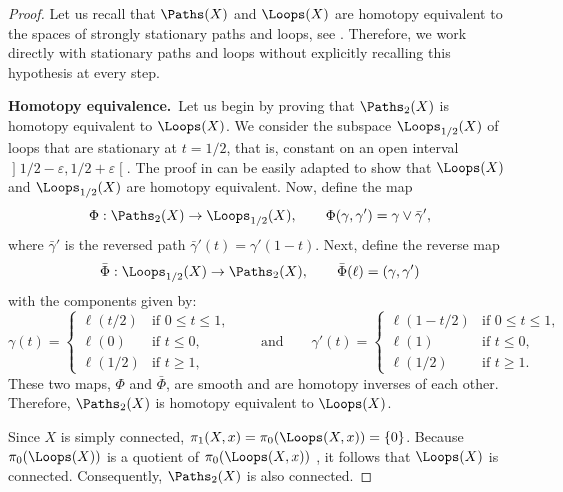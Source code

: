 \begin{proof}
  Let us recall that $\Paths(X)$ and $\Loops(X)$ are homotopy equivalent to the spaces of strongly stationary paths and loops,
  see \cite[]{PIZ13}.
  Therefore,
  we work directly with stationary paths and loops without explicitly recalling this hypothesis at every step.
  
  \textbf{Homotopy equivalence.}~Let us begin by proving that $\Paths_2(X)$ is homotopy equivalent to $\Loops(X)$.
  We consider the subspace $\Loops_{1/2}(X)$ of loops that are stationary at $t = 1/2$,
  that is,
  constant on an open interval $\mathopen]1/2 -\varepsilon, 1/2+\varepsilon\mathclose[$.
  The proof in \cite[Ex. 84]{PIZ13} can be easily adapted to show that $\Loops(X)$ and $\Loops_{1/2}(X)$ are homotopy equivalent.
  Now,
  define the map
  \[
    \Phi: \Paths_2(X) \to \Loops_{1/2}(X),
    \qquad
    \Phi(\gamma,\gamma') = \gamma \vee \bar\gamma',
    \]
  where $\bar\gamma'$ is the reversed path $\bar\gamma'(t) = \gamma'(1-t)$.
  Next,
  define the reverse map
  \[
    \bar\Phi : \Loops_{1/2}(X) \to \Paths_2(X),
    \qquad
    \bar\Phi(\ell) = (\gamma,\gamma')
    \]
  with the components given by:
  \[
    \gamma(t) =
    \begin{cases}
    \ell(t/2) & \text{if } 0 \leq t \leq 1, \\
    \ell(0)   & \text{if } t \leq 0, \\
    \ell(1/2) & \text{if } t \geq 1,
    \end{cases}
    \qquad\text{and}\qquad
    \gamma'(t) =
    \begin{cases}
    \ell(1-t/2) & \text{if } 0 \leq t \leq 1, \\
    \ell(1)     & \text{if } t \leq 0, \\
    \ell(1/2)   & \text{if } t \geq 1.
    \end{cases}
    \]
  These two maps,
  $\Phi$ and $\bar\Phi$,
  are smooth and are homotopy inverses of each other.
  Therefore,
  $\Paths_2(X)$ is homotopy equivalent to $\Loops(X)$.
  
  Since $X$ is simply connected,
  $\pi_1(X,x) = \pi_0(\Loops(X,x)) = \{0\}$.
  Because $\pi_0(\Loops(X))$ is a quotient of $\pi_0(\Loops(X,x))$ \cite[Ex. 87]{PIZ13},
  it follows that $\Loops(X)$ is connected.
  Consequently,
  $\Paths_2(X)$ is also connected.
  

\end{proof}
